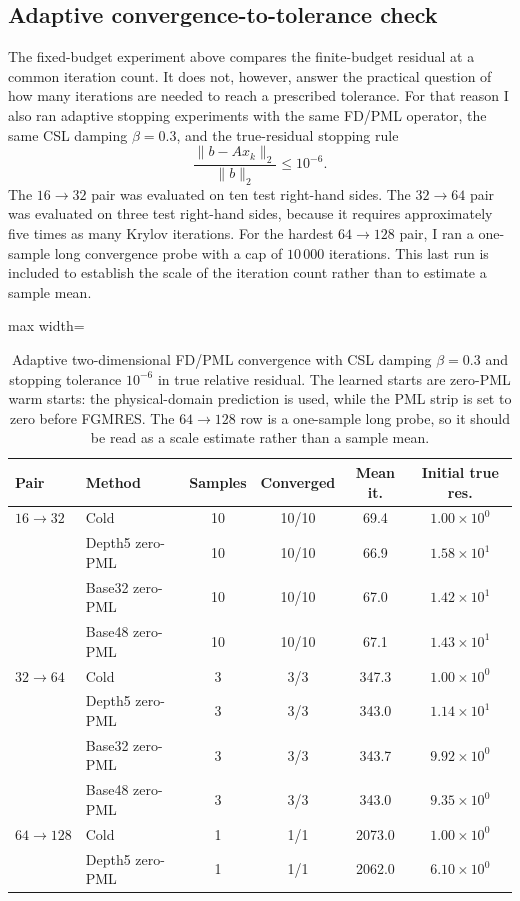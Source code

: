 \subsection{Adaptive convergence-to-tolerance check}
\label{subsec:results-2d-adaptive-convergence}

The fixed-budget experiment above compares the finite-budget residual at a
common iteration count. It does not, however, answer the practical question of
how many iterations are needed to reach a prescribed tolerance. For that
reason I also ran adaptive stopping experiments with the same FD/PML operator,
the same CSL damping $\beta=0.3$, and the true-residual stopping rule
\[
    \frac{\|b-Ax_k\|_2}{\|b\|_2} \leq 10^{-6}.
\]
The $16\to32$ pair was evaluated on ten test right-hand sides. The
$32\to64$ pair was evaluated on three test right-hand sides, because it
requires approximately five times as many Krylov iterations. For the hardest
$64\to128$ pair, I ran a one-sample long convergence probe with a cap of
$10\,000$ iterations. This last run is included to establish the scale of the
iteration count rather than to estimate a sample mean.

\begin{table}[htbp]
\centering
\caption{Adaptive two-dimensional FD/PML convergence with CSL damping
$\beta=0.3$ and stopping tolerance $10^{-6}$ in true relative residual. The
learned starts are zero-PML warm starts: the physical-domain prediction is
used, while the PML strip is set to zero before FGMRES. The $64\to128$ row is
a one-sample long probe, so it should be read as a scale estimate rather than
a sample mean.}
\label{tab:results-2d-adaptive-all-pairs}
\begin{adjustbox}{max width=\textwidth}
\begin{tabular}{llcccc}
\toprule
Pair & Method & Samples & Converged & Mean it. & Initial true res. \\
\midrule
$16\to32$ & Cold & 10 & 10/10 & 69.4 & $1.00\times10^{0}$ \\
& Depth5 zero-PML & 10 & 10/10 & 66.9 & $1.58\times10^{1}$ \\
& Base32 zero-PML & 10 & 10/10 & 67.0 & $1.42\times10^{1}$ \\
& Base48 zero-PML & 10 & 10/10 & 67.1 & $1.43\times10^{1}$ \\
\midrule
$32\to64$ & Cold & 3 & 3/3 & 347.3 & $1.00\times10^{0}$ \\
& Depth5 zero-PML & 3 & 3/3 & 343.0 & $1.14\times10^{1}$ \\
& Base32 zero-PML & 3 & 3/3 & 343.7 & $9.92\times10^{0}$ \\
& Base48 zero-PML & 3 & 3/3 & 343.0 & $9.35\times10^{0}$ \\
\midrule
$64\to128$ & Cold & 1 & 1/1 & 2073.0 & $1.00\times10^{0}$ \\
& Depth5 zero-PML & 1 & 1/1 & 2062.0 & $6.10\times10^{0}$ \\
\bottomrule
\end{tabular}
\end{adjustbox}
\end{table}

